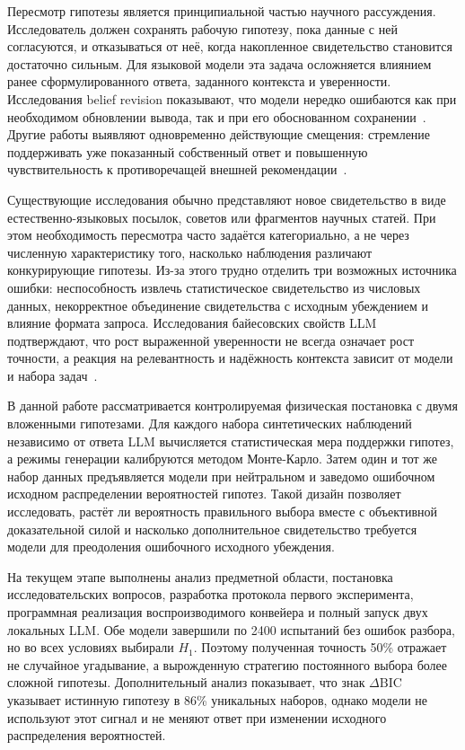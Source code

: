 \documentclass[a4paper,14pt]{extarticle}
\newcommand{\Hone}{\ensuremath{H_1}}
\newcommand{\DeltaBIC}{\ensuremath{\Delta\mathrm{BIC}}}
\begin{document}
Пересмотр гипотезы является принципиальной частью научного рассуждения. Исследователь должен сохранять рабочую гипотезу, пока данные с ней согласуются, и отказываться от неё, когда накопленное свидетельство становится достаточно сильным. Для языковой модели эта задача осложняется влиянием ранее сформулированного ответа, заданного контекста и уверенности. Исследования belief revision показывают, что модели нередко ошибаются как при необходимом обновлении вывода, так и при его обоснованном сохранении~\cite{beliefrevision}. Другие работы выявляют одновременно действующие смещения: стремление поддерживать уже показанный собственный ответ и повышенную чувствительность к противоречащей внешней рекомендации~\cite{competingbiases}.

Существующие исследования обычно представляют новое свидетельство в виде естественно-языковых посылок, советов или фрагментов научных статей. При этом необходимость пересмотра часто задаётся категориально, а не через численную характеристику того, насколько наблюдения различают конкурирующие гипотезы. Из-за этого трудно отделить три возможных источника ошибки: неспособность извлечь статистическое свидетельство из числовых данных, некорректное объединение свидетельства с исходным убеждением и влияние формата запроса. Исследования байесовских свойств LLM подтверждают, что рост выраженной уверенности не всегда означает рост точности, а реакция на релевантность и надёжность контекста зависит от модели и набора задач~\cite{evidencetobelief}.

В данной работе рассматривается контролируемая физическая постановка с двумя вложенными гипотезами. Для каждого набора синтетических наблюдений независимо от ответа LLM вычисляется статистическая мера поддержки гипотез, а режимы генерации калибруются методом Монте-Карло. Затем один и тот же набор данных предъявляется модели при нейтральном и заведомо ошибочном исходном распределении вероятностей гипотез. Такой дизайн позволяет исследовать, растёт ли вероятность правильного выбора вместе с объективной доказательной силой и насколько дополнительное свидетельство требуется модели для преодоления ошибочного исходного убеждения.

На текущем этапе выполнены анализ предметной области, постановка исследовательских вопросов, разработка протокола первого эксперимента, программная реализация воспроизводимого конвейера и полный запуск двух локальных LLM. Обе модели завершили по 2400 испытаний без ошибок разбора, но во всех условиях выбирали \Hone. Поэтому полученная точность 50\% отражает не случайное угадывание, а вырожденную стратегию постоянного выбора более сложной гипотезы. Дополнительный анализ показывает, что знак \DeltaBIC{} указывает истинную гипотезу в 86\% уникальных наборов, однако модели не используют этот сигнал и не меняют ответ при изменении исходного распределения вероятностей.
\end{document}
